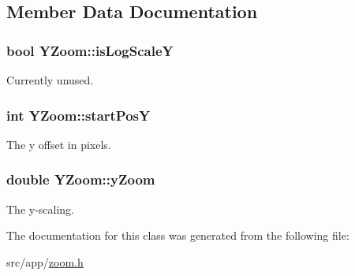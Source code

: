 \subsection{Member Data Documentation}
\hypertarget{classYZoom_a567f0d098e5946bce74b0bcc97bc328d}{
\subsubsection[{isLogScaleY}]{\setlength{\rightskip}{0pt plus 5cm}bool {\bf YZoom::isLogScaleY}}}
\label{classYZoom_a567f0d098e5946bce74b0bcc97bc328d}
Currently unused. \hypertarget{classYZoom_af355677b65fef84eb770465ecc0a798d}{
\subsubsection[{startPosY}]{\setlength{\rightskip}{0pt plus 5cm}int {\bf YZoom::startPosY}}}
\label{classYZoom_af355677b65fef84eb770465ecc0a798d}
The y offset in pixels. \hypertarget{classYZoom_aa271e5b2fe2e341750e8382a520ee5ec}{
\subsubsection[{yZoom}]{\setlength{\rightskip}{0pt plus 5cm}double {\bf YZoom::yZoom}}}
\label{classYZoom_aa271e5b2fe2e341750e8382a520ee5ec}
The y-\/scaling. 

The documentation for this class was generated from the following file:\begin{DoxyCompactItemize}
\item 
src/app/\hyperlink{zoom_8h}{zoom.h}\end{DoxyCompactItemize}
